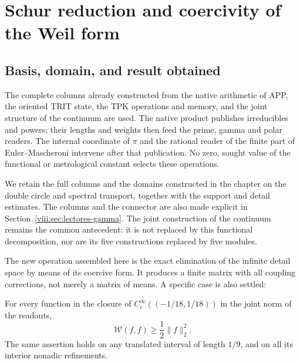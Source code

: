 \clearpage
\section{Schur reduction and coercivity of the Weil form}
\label{viii:sec:schur-coercividad}


\subsection{Basis, domain, and result obtained}
\label{viii:schur-add-sub-6}

The complete columns already constructed from the native arithmetic
of APP, the oriented TRIT state, the TPK operations and memory, and the
joint structure of the continuum are used. The native product publishes irreducibles and
powers; their lengths and weights then feed the prime,
gamma and polar readers. The internal coordinate of \(\pi\) and the rational reader of the finite
part of Euler--Mascheroni intervene after that publication. No
zero, sought value of the functional or metrological constant selects these
operations.

We retain the full columns and the domains constructed in the
chapter on the double circle and spectral transport, together with the
support and detail estimates. The columns and the connector are also made explicit in
Section~\ref{viii:sec:lectores-gamma}. The joint construction
of the continuum remains the common antecedent: it is not replaced by this
functional decomposition, nor are its five constructions replaced by five modules.

The new operation assembled here is the exact elimination of the
infinite detail space by means of its coercive form. It produces a finite matrix
with all coupling corrections, not merely a matrix of
means. A specific case is also settled:

For every function in the closure of
\(C_c^\infty((-1/18,1/18))\) in the joint norm of the readouts,
\begin{equation}
\mathscr W(f,f)\geq\frac12\|f\|_2^2.
\label{viii:schur-add-display-1}
\end{equation}
The same assertion holds on any translated interval of length
\(1/9\), and on all its interior nonadic refinements.

